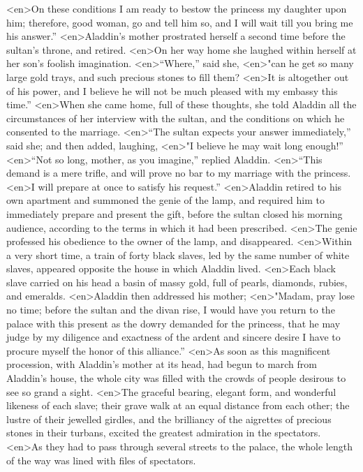 <en>On these conditions I am ready to bestow the princess my daughter upon him; therefore, good woman, go and tell him so, and I will wait till you bring me his answer.”
<en>Aladdin’s mother prostrated herself a second time before the sultan’s throne, and retired.
<en>On her way home she laughed within herself at her son’s foolish imagination.
<en>“Where,” said she,
<en>"can he get so many large gold trays, and such precious stones to fill them?
<en>It is altogether out of his power, and I believe he will not be much pleased with my embassy this time.”
<en>When she came home, full of these thoughts, she told Aladdin all the circumstances of her interview with the sultan, and the conditions on which he consented to the marriage.
<en>“The sultan expects your answer immediately,” said she; and then added, laughing,
<en>"I believe he may wait long enough!”
<en>“Not so long, mother, as you imagine,” replied Aladdin.
<en>“This demand is a mere trifle, and will prove no bar to my marriage with the princess.
<en>I will prepare at once to satisfy his request.”
<en>Aladdin retired to his own apartment and summoned the genie of the lamp, and required him to immediately prepare and present the gift, before the sultan closed his morning audience, according to the terms in which it had been prescribed.
<en>The genie professed his obedience to the owner of the lamp, and disappeared.
<en>Within a very short time, a train of forty black slaves, led by the same number of white slaves, appeared opposite the house in which Aladdin lived.
<en>Each black slave carried on his head a basin of massy gold, full of pearls, diamonds, rubies, and emeralds.
<en>Aladdin then addressed his mother;
<en>"Madam, pray lose no time; before the sultan and the divan rise, I would have you return to the palace with this present as the dowry demanded for the princess, that he may judge by my diligence and exactness of the ardent and sincere desire I have to procure myself the honor of this alliance.”
<en>As soon as this magnificent procession, with Aladdin’s mother at its head, had begun to march from Aladdin’s house, the whole city was filled with the crowds of people desirous to see so grand a sight.
<en>The graceful bearing, elegant form, and wonderful likeness of each slave; their grave walk at an equal distance from each other; the lustre of their jewelled girdles, and the brilliancy of the aigrettes of precious stones in their turbans, excited the greatest admiration in the spectators.
<en>As they had to pass through several streets to the palace, the whole length of the way was lined with files of spectators.
